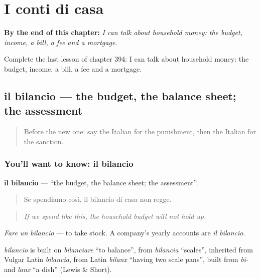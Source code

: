 
\chapter{I conti di casa}
\label{ch:it-i-conti-di-casa}

\begin{chapteropening}
\textbf{By the end of this chapter:} \emph{I can talk about household money: the budget, income, a bill, a fee and a mortgage.}

Complete the last lesson of chapter 394: I can talk about household money: the budget, income, a bill, a fee and a mortgage.
\end{chapteropening}

\section[il bilancio]{il bilancio — the budget, the balance sheet; the assessment}

\label{lesson:IT-C394-bilancio}



\begin{quote}
Before the new one: say the Italian for the punishment, then the Italian for the sanction.
\end{quote}

\subsection*{You'll want to know: il bilancio}
\textbf{il bilancio} — \textquotedblleft{}the budget, the balance sheet; the assessment\textquotedblright{}.

\begin{quote}
Se spendiamo così, il bilancio di casa non regge.
\end{quote}

\begin{quote}
\emph{If we spend like this, the household budget will not hold up.}
\end{quote}

\emph{Fare un bilancio} — to take stock. A company's yearly accounts are \emph{il bilancio}.

\begin{cousinweb}
\emph{bilancio} is built on \emph{bilanciare} \textquotedblleft{}to balance\textquotedblright{}, from \emph{bilancia} \textquotedblleft{}scales\textquotedblright{}, inherited from Vulgar Latin \emph{bilancia}, from Latin \emph{bilanx} \textquotedblleft{}having two scale pans\textquotedblright{}, built from \emph{bi-} and \emph{lanx} \textquotedblleft{}a dish\textquotedblright{} (Lewis \& Short).
\end{cousinweb}

